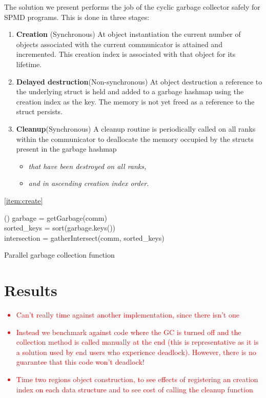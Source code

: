 \documentclass[10pt,journal,compsoc]{IEEEtran}
\newcommand{\jacknotes}[1]{\textcolor{red}{#1}}
\begin{document}
The solution we present performs the job of the cyclic garbage collector safely for SPMD programs.
This is done in three stages:
\begin{enumerate}
	\item \label{item:create}\textbf{Creation} (Synchronous) At object instantiation the current number of objects associated with the current communicator is attained and incremented. This creation index is associated with that object for its lifetime.
	\item \label{item:destroy}\textbf{Delayed destruction}(Non-synchronous) At object destruction a reference to the underlying struct is held and added to a garbage hashmap using the creation index as the key. The memory is not yet freed as a reference to the struct persists.
	\item \label{item:cleanup}\textbf{Cleanup}(Synchronous) A cleanup routine is periodically called on all ranks within the communicator to deallocate the memory occupied by the structs present in the garbage hashmap 
	\begin{itemize}
	\item \emph{that have been destroyed on all ranks,}
	\item \emph{and in ascending creation index order}.
\end{itemize}
\end{enumerate}

\cref{item:create}

\begin{algorithm}[htp]
	\Function(){
		garbage = getGarbage(comm)\\
		sorted\_keys = sort(garbage.keys())\\
		intersection = gatherIntersect(comm, sorted\_keys)\\
	}
	\caption[]{Parallel garbage collection function}
\end{algorithm}

\section{Results}
\label{sec:results}
\jacknotes{
\begin{itemize}
	\item Can't really time against another implementation, since there isn't one
	\item Instead we benchmark against code where the GC is turned off and the collection method is called manually at the end (this is representative as it is a solution used by end users who experience deadlock). However, there is no guarantee that this code won't deadlock!
	\item Time two regions object construction, to see effects of registering an creation index on each data structure and to see cost of calling the cleanup function
\end{itemize}
}
\end{document}
